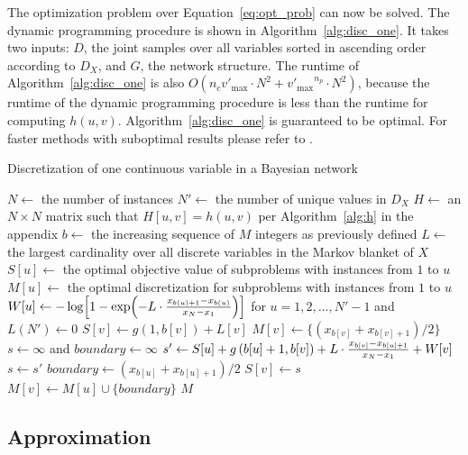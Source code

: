 The optimization problem over Equation~\ref{eq:opt_prob} can now be solved.
The dynamic programming procedure is shown in Algorithm~\ref{alg:disc_one}.
It takes two inputs: $D$, the joint samples over all variables sorted in ascending order according to $D_X$, and $G$, the network structure.
The runtime of Algorithm~\ref{alg:disc_one} is also $O(n_c  {v'_\text{max}} \cdot N^2 + {v'_\text{max}}^{n_p} \cdot N^2)$, because the runtime of the dynamic programming procedure is less than the runtime for computing $h(u,v)$.
Algorithm~\ref{alg:disc_one} is guaranteed to be optimal.
For faster methods with suboptimal results please refer to \citep{Boulle_2006}.

\begin{algorithm}
\caption{Discretization of one continuous variable in a Bayesian network}
\label{alg:disc_one}
\begin{algorithmic}[5]
\State
\State $N \leftarrow$ the number of instances
\State $N' \leftarrow$ the number of unique values in $D_X$
\State $H \leftarrow$ an $N \times N$ matrix such that $H[u,v] = h(u,v)$ per Algorithm~\ref{alg:h} in the appendix
\State $b \leftarrow$ the increasing sequence of $M$ integers as previously defined
\State $L \leftarrow$ the largest cardinality over all discrete variables in the Markov blanket of $X$
\State $S[u] \leftarrow$ the optimal objective value of subproblems with instances from $1$ to $u$
\State $M[u] \leftarrow$ the optimal discretization for subproblems with instances from $1$ to $u$
\State $W[u]  \leftarrow - \log\brock{1 - {\exp\paren{- L \cdot{ {{x_{b(u)+1} - x_{b(u)}}\over{x_N - x_1}}}}}}$ for $u = 1,2, \ldots,N'-1$ and $L(N') \leftarrow 0$
\State
{}
\State $S[v] \leftarrow g \left(1,b[v] \right) + L[v]$
\State $M[v] \leftarrow \{ ({x_{b[v]} + x_{b[v]+1}}) / 2\}$
\Else
\State $s \leftarrow \infty$ and $boundary \leftarrow \infty$
\State $s' \leftarrow S[u] + g \left( b[u]+1,b[v] \right) +  {L \cdot {{x_{b[v]} - x_{b[u] + 1}}\over{x_N - x_1}}} + W[v]$
\State $s \leftarrow s'$
\State $boundary \leftarrow ({x_{b[u]} + x_{b[u]+1}}) / 2$
\EndIf
\EndFor
\State $S[v] \leftarrow s$
\State $M[v] \leftarrow M[u] \cup \{ boundary\}$
\EndIf
\EndFor
 \State \Return $M$
\EndFunction
\end{algorithmic}
\end{algorithm}


\subsection{Approximation}

